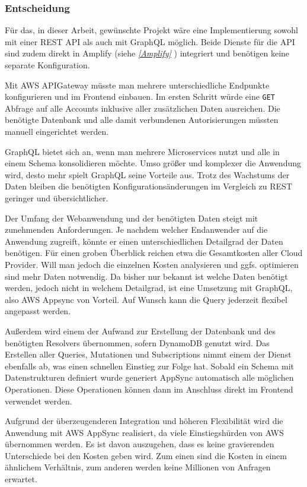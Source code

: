 \subsubsection{Entscheidung}
Für das, in dieser Arbeit, gewünschte Projekt wäre eine Implementierung sowohl mit einer REST API als auch mit GraphQL möglich.
Beide Dienste für die API sind zudem direkt in Amplify (siehe \textit{\ref{Amplify} }) integriert und benötigen keine separate Konfiguration.

Mit AWS APIGateway müsste man mehrere unterschiedliche Endpunkte konfigurieren und im Frontend einbauen.
Im ersten Schritt würde eine \verb+GET+ Abfrage auf alle Accounts inklusive aller zusätzlichen Daten ausreichen.
Die benötigte Datenbank und alle damit verbundenen Autorisierungen müssten manuell eingerichtet werden.

GraphQL bietet sich an, wenn man mehrere Microservices nutzt und alle in einem Schema konsolidieren möchte.
Umso größer und komplexer die Anwendung wird, desto mehr spielt GraphQL seine Vorteile aus.
Trotz des Wachstums der Daten bleiben die benötigten Konfigurationsänderungen im Vergleich zu REST geringer und übersichtlicher.

Der Umfang der Webanwendung und der benötigten Daten steigt mit zunehmenden Anforderungen.
Je nachdem welcher Endanwender auf die Anwendung zugreift, könnte er einen unterschiedlichen Detailgrad der Daten benötigen.
Für einen groben Überblick reichen etwa die Gesamtkosten aller Cloud Provider.
Will man jedoch die einzelnen Kosten analysieren und ggfs. optimieren sind mehr Daten notwendig.
Da bisher nur bekannt ist welche Daten benötigt werden, jedoch nicht in welchem Detailgrad, ist eine Umsetzung mit GraphQL, also AWS Appsync von Vorteil.
Auf Wunsch kann die Query jederzeit flexibel angepasst werden.

Außerdem wird einem der Aufwand zur Erstellung der Datenbank und des benötigten Resolvers übernommen, sofern DynamoDB genutzt wird.
Das Erstellen aller Queries, Mutationen und Subscriptions nimmt einem der Dienst ebenfalls ab, was einen schnellen Einstieg zur Folge hat.
Sobald ein Schema mit Datenstrukturen definiert wurde generiert AppSync automatisch alle möglichen Operationen.
Diese Operationen können dann im Anschluss direkt im Frontend verwendet werden.

Aufgrund der überzeugenderen Integration und höheren Flexibilität wird die Anwendung mit AWS AppSync realisiert, da viele Einstiegshürden von AWS übernommen werden.
Es ist davon auszugehen, dass es keine gravierenden Unterschiede bei den Kosten geben wird.
Zum einen sind die Kosten in einem ähnlichem Verhältnis, zum anderen werden keine Millionen von Anfragen erwartet.





